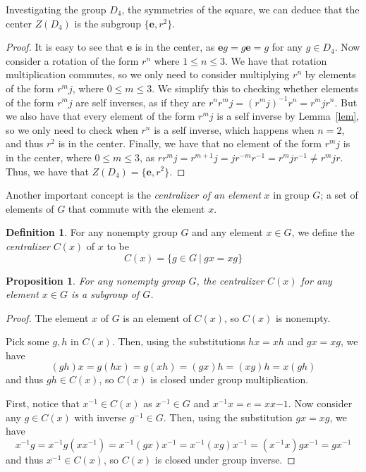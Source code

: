 \documentclass[12pt]{amsart}
\newtheorem{proposition}[theorem]{Proposition}
\theoremstyle{definition}
\newtheorem{definition}[theorem]{Definition}
\theoremstyle{plain}
\def\id{{\mathbf e}}
\begin{document}
Investigating the group $D_4$, the symmetries of the square, we can deduce that the center $Z(D_4)$ is the subgroup $\{\id, r^2\}$.
\begin{proof}
    It is easy to see that $\id$ is in the center, as $\id g = g \id = g$ for any $g \in D_4$. Now consider a rotation of the form $r^n$ where $1 \leq n \leq 3$. We have that rotation multiplication commutes, so we only need to consider multiplying $r^n$ by elements of the form $r^mj$, where $0 \leq m \leq 3$. We simplify this to checking whether elements of the form $r^mj$ are self inverses, as if they are $r^nr^mj = (r^mj)^{-1}r^n = r^mjr^n $. But we also have that every element of the form $r^mj$ is a self inverse by Lemma~\ref{lem}, so we only need to check when $r^{n}$ is a self inverse, which happens when $n = 2$, and thus $r^2 $ is in the center. Finally, we have that no element of the form  $r^mj$ is in the center, where $0 \leq m \leq 3$, as $rr^mj = r^{m+1}j = j r^{-m}r^{-1} = r^{m}jr^{-1} \neq r^mjr$. Thus, we have that $Z(D_4) = \{ \id, r^2 \}$.
\end{proof}

Another important concept is the \emph{centralizer of an element} $x$ in group $G$; a set of elements of $G$ that commute with the element $x$.

\begin{definition}
    For any nonempty group $G$ and any element $x\in G$, we define the \emph{centralizer} $C(x)$ of $x$ to be
    \[
    C(x) = \{ g \in G~|~ gx =xg\}
    \]
\end{definition}

\begin{proposition}
    For any nonempty group $G$, the centralizer $C(x)$ for any element $x\in G$ is a subgroup of $G$.
\end{proposition}

\begin{proof}
    The element $x$ of $G$ is an element of $C(x)$, so $C(x)$ is nonempty. 
    
    Pick some $g,h$ in $C(x)$. Then, using the substitutions $hx = xh$ and $gx = xg$, we have
    \[
        (gh)x = g(hx) = g(xh) = (gx)h = (xg)h = x(gh)
    \]
    and thus $gh \in C(x)$, so $C(x)$ is closed under group multiplication.

    First, notice that $x^{-1} \in C(x)$ as $x^{-1} \in G$ and $x^{-1}x = e = xx{-1}$. Now consider any $g \in C(x)$ with inverse $g^{-1} \in G$. Then, using the substitution $gx = xg$, we have
    \[
        x^{-1}g = x^{-1}g(xx^{-1}) = x^{-1}(gx)x^{-1} = x^{-1}(xg)x^{-1} = (x^{-1}x)gx^{-1} = gx^{-1}
    \]
    and thus $x^{-1} \in C(x)$, so $C(x)$ is closed under group inverse.
\end{proof}
\end{document}
